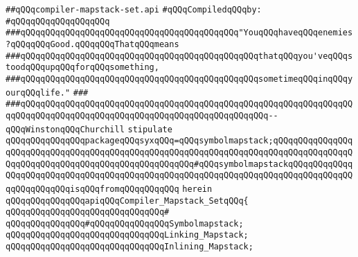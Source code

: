 \label{src/lib/compiler/toplevel/compiler-state/compiler-mapstack-set.api}
\verb|##qQQqcompiler-mapstack-set.api|\newline
\newline
\verb|#qQQqCompiledqQQqby:|\newline
\verb|#qQQqqQQqqQQqqQQqqQQq|\newline
\newline
\newline
\newline
\verb|###qQQqqQQqqQQqqQQqqQQqqQQqqQQqqQQqqQQqqQQqqQQq"YouqQQqhaveqQQqenemies?qQQqqQQqGood.qQQqqQQqThatqQQqmeans|\newline
\verb|###qQQqqQQqqQQqqQQqqQQqqQQqqQQqqQQqqQQqqQQqqQQqqQQqthatqQQqyou'veqQQqstoodqQQqupqQQqforqQQqsomething,|\newline
\verb|###qQQqqQQqqQQqqQQqqQQqqQQqqQQqqQQqqQQqqQQqqQQqqQQqsometimeqQQqinqQQqyourqQQqlife."|\newline
\verb|###|\newline
\verb|###qQQqqQQqqQQqqQQqqQQqqQQqqQQqqQQqqQQqqQQqqQQqqQQqqQQqqQQqqQQqqQQqqQQqqQQqqQQqqQQqqQQqqQQqqQQqqQQqqQQqqQQqqQQqqQQqqQQqqQQq--qQQqWinstonqQQqChurchill|\newline
\newline
\newline
\verb|stipulate|\newline
\verb|qQQqqQQqqQQqqQQqpackageqQQqsyxqQQq=qQQqsymbolmapstack;qQQqqQQqqQQqqQQqqQQqqQQqqQQqqQQqqQQqqQQqqQQqqQQqqQQqqQQqqQQqqQQqqQQqqQQqqQQqqQQqqQQqqQQqqQQqqQQqqQQqqQQqqQQqqQQqqQQqqQQqqQQq#qQQqsymbolmapstackqQQqqQQqqQQqqQQqqQQqqQQqqQQqqQQqqQQqqQQqqQQqqQQqqQQqqQQqqQQqqQQqqQQqqQQqqQQqqQQqqQQqqQQqqQQqqQQqisqQQqfromqQQqqQQqqQQq|\newline
\verb|herein|\newline
\newline
\verb|qQQqqQQqqQQqqQQqapiqQQqCompiler_Mapstack_SetqQQq{|\newline
\verb|qQQqqQQqqQQqqQQqqQQqqQQqqQQqqQQq#|\newline
\verb|qQQqqQQqqQQqqQQq#qQQqqQQqqQQqqQQqSymbolmapstack;|\newline
\verb|qQQqqQQqqQQqqQQqqQQqqQQqqQQqqQQqLinking_Mapstack;|\newline
\verb|qQQqqQQqqQQqqQQqqQQqqQQqqQQqqQQqInlining_Mapstack;|\newline
